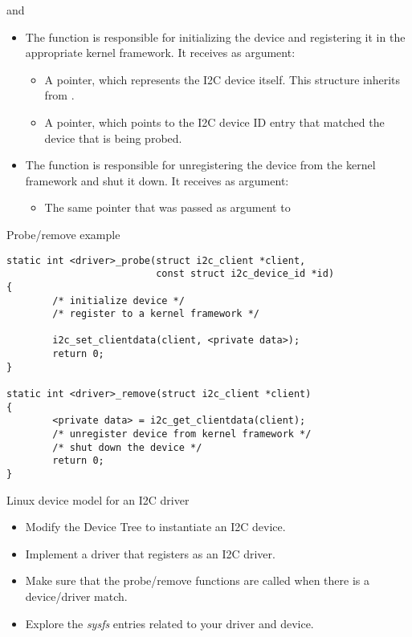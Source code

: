 \begin{frame}{ and }

  \begin{itemize}
  \item The  function is responsible for initializing
    the device and registering it in the appropriate kernel
    framework. It receives as argument:
    \begin{itemize}
    \item A  pointer, which represents the I2C
      device itself. This structure inherits from .
    \item A  pointer, which points to the
      I2C device ID entry that matched the device that is being
      probed.
    \end{itemize}
  \item The  function is responsible for
    unregistering the device from the kernel framework and shut it
    down. It receives as argument:
    \begin{itemize}
    \item The same  pointer that was passed as
      argument to 
    \end{itemize}
  \end{itemize}
\end{frame}

\begin{frame}[fragile]{Probe/remove example}
  \begin{block}{}
    \begin{verbatim}
static int <driver>_probe(struct i2c_client *client,
                          const struct i2c_device_id *id)
{
        /* initialize device */
        /* register to a kernel framework */

        i2c_set_clientdata(client, <private data>);
        return 0;
}

static int <driver>_remove(struct i2c_client *client)
{
        <private data> = i2c_get_clientdata(client);
        /* unregister device from kernel framework */
        /* shut down the device */
        return 0;
}
    \end{verbatim}
  \end{block}
\end{frame}

\setuplabframe
{Linux device model for an I2C driver}
{
  \begin{itemize}
  \item Modify the Device Tree to instantiate an I2C device.
  \item Implement a driver that registers as an I2C driver.
  \item Make sure that the probe/remove functions are called
        when there is a device/driver match.
  \item Explore the {\em sysfs} entries related to your driver and
    device.
  \end{itemize}
}

